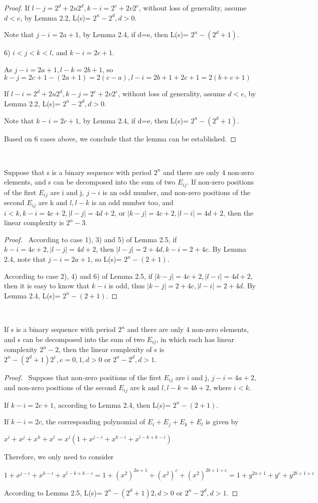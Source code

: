 \documentclass[10pt,conference,twocolumn]{IEEEtran}
\begin{document}
\begin{proof}
 If $l-j=2^d+2u2^d, k-i=2^e+2v2^e$, without
loss of generality, assume $d<e$, by Lemma 2.2, L(s)= $2^n-2^d,d>0$.

Note that $j-i=2a+1$, by Lemma 2.4, if d=e, then L(s)=
$2^n-(2^d+1)$.

6) $i<j<k<l$, and $k-i=2c+1$.

As $j-i=2a+1,l-k=2b+1$, so $k-j=2c+1-(2a+1)=2(c-a),
l-i=2b+1+2c+1=2(b+c+1)$

 If $l-i=2^d+2u2^d, k-j=2^e+2v2^e$, without loss of
generality, assume $d<e$, by Lemma 2.2, L(s)= $2^n-2^d,d>0$.

Note that $k-i=2c+1$, by Lemma 2.4, if d=e, then L(s)=
$2^n-(2^d+1)$.

Based on 6 cases above, we conclude that the lemma can be
established.
\end{proof}\



 Suppose that s is a binary sequence
with period $2^n$ and there are only 4 non-zero elements, and s can
be decomposed into the sum of two $E_{ij}$. If non-zero positions of
the first $E_{ij}$ are i and j, $j-i$ is an odd number, and non-zero
positions of the second $E_{ij}$ are k and $l, l-k$ is an odd number
too, and $i<k, k-i=4c+2, |l-j|=4d+2$, or $|k-j|=4c+2, |l-i|=4d+2$,
then the linear complexity is $2^n-3$.

\begin{proof}\
 According to case 1), 3) and 5) of Lemma 2.5, if $k-i=4c+2, |l-j|=4d+2$, then $|l-j|=2+4d, k-i=2+4c$.
  By Lemma 2.4, note that $j-i=2a+1$, so L(s)= $2^n-(2+1)$.

According to case 2), 4) and 6) of Lemma 2.5, if $|k-j|=4c+2,
|l-i|=4d+2$, then it is easy to know that $k-i$ is odd, thus
$|k-j|=2+4c, |l-i|=2+4d$. By Lemma 2.4, L(s)= $2^n-(2+1)$.
\end{proof}\



 If  s is a binary sequence with
period $2^n$ and there are only 4 non-zero elements, and s can be
decomposed into the sum of two $E_{ij}$, in which each has linear
complexity $2^n-2$, then the linear complexity of s is
$2^n-(2^d+1)2^e,e=0,1, d>0$ or $2^n-2^d, d>1$.

\begin{proof}\
 Suppose that non-zero positions of the first $E_{ij}$ are i and j, $j-i=4a+2$,
 and non-zero positions of the second $E_{ij}$ are k and $l, l-k=4b+2$, where $i<k$.

If $k-i=2c+1$, according to Lemma 2.4, then L(s)= $2^n-(2+1)$.

If $k-i=2c$, the corresponding polynomial of $E_i+E_j +E_k+E_l$ is
given by

$x^i+x^j+x^k+x^l=x^i(1+x^{j-i}+x^{k-i}+x^{l-k+k-i})$

Therefore, we only need to consider

$1+x^{j-i}+x^{k-i}+x^{l-k+k-i}=1+(x^2)^{2a+1}+(x^2)^c+(x^2)^{2b+1+c}=1+y^{2a+1}+y^c+y^{2b+1+c}$

According to Lemma 2.5, L(s)= $2^n-(2^d+1)2, d>0$ or $2^n-2^d, d>1$.
\end{proof}\
\end{document}
